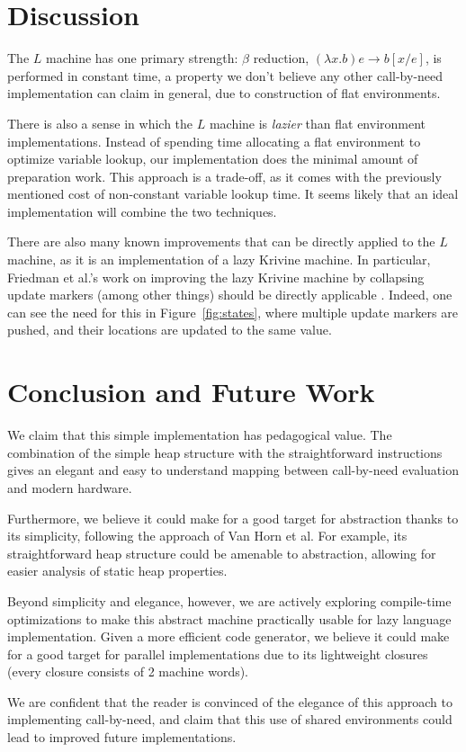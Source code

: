 \documentclass[preprint]{sigplanconf}
\begin{document}


\section{Discussion}
The $L$ machine has one primary strength: $\beta$ reduction, $(\lambda x.b) e
\rightarrow b[x/e]$, is performed in constant time, a property we don't believe
any other call-by-need implementation can claim in general, due to construction
of flat environments.

There is also a sense in which the $L$ machine is \emph{lazier} than flat
environment implementations. Instead of spending time allocating a flat
environment to optimize variable lookup, our implementation does the minimal
amount of preparation work. This approach is a trade-off, as it comes with the
previously mentioned cost of non-constant variable lookup time. It seems likely
that an ideal implementation will combine the two techniques. 

There are also many known improvements that can be directly applied to the $L$
machine, as it is an implementation of a lazy Krivine machine. In particular,
Friedman et al.'s work on improving the lazy Krivine machine by collapsing
update markers (among other things) should be directly applicable \cite{lkm}.
Indeed, one can see the need for this in Figure~\ref{fig:states}, where multiple
update markers are pushed, and their locations are updated to the same value.

\section{Conclusion and Future Work}
We claim that this simple implementation has pedagogical value. The combination
of the simple heap structure with the straightforward instructions gives an
elegant and easy to understand mapping between call-by-need evaluation and
modern hardware.

Furthermore, we believe it could make for a good target for abstraction thanks
to its simplicity, following the approach of Van Horn et
al\cite{van2010abstracting}. For example, its straightforward heap structure
could be amenable to abstraction, allowing for easier analysis of static heap
properties.

Beyond simplicity and elegance, however, we are actively exploring compile-time
optimizations to make this abstract machine practically usable for lazy language
implementation. Given a more efficient code generator, we believe it could make
for a good target for parallel implementations due to its lightweight closures
(every closure consists of 2 machine words).

We are confident that the reader is convinced of the elegance of this approach
to implementing call-by-need, and claim that this use of shared environments
could lead to improved future implementations. 



\end{document}
